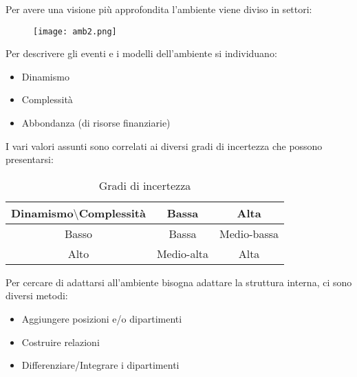 \documentclass{article}
\begin{document}
\noindent Per avere una visione più approfondita l'ambiente viene diviso in settori:

\begin{figure}[ht]
    \centering
    \texttt{[image: amb2.png]}
\end{figure}

\noindent Per descrivere gli eventi e i modelli dell'ambiente si individuano:
\begin{itemize}
    \item Dinamismo
    \item Complessità
    \item Abbondanza (di risorse finanziarie)
\end{itemize}

\noindent I vari valori assunti sono correlati ai diversi gradi di incertezza che possono presentarsi:

\begin{table}[ht]
    \centering
    \begin{tabular}{c|c|c}
        Dinamismo$\setminus$Complessità & Bassa & Alta\\
         \hline
        Basso & Bassa & Medio-bassa\\
        \hline
        Alto & Medio-alta & Alta\\
    \end{tabular}
    \caption{Gradi di incertezza}
\end{table}

\noindent Per cercare di adattarsi all'ambiente bisogna adattare la struttura interna, ci sono diversi metodi:
\begin{itemize}
    \item Aggiungere posizioni e/o dipartimenti
    \item Costruire relazioni
    \item Differenziare/Integrare i dipartimenti\newline
\end{itemize}
\end{document}
